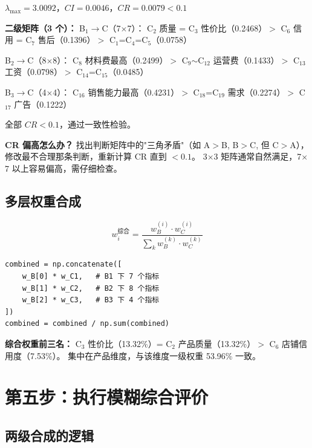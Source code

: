 \documentclass[a4paper,11pt]{ctexart}
\begin{document}
$\lambda_{\max}=3.0092$，$CI=0.0046$，$CR=0.0079 < 0.1$~\checkmark

\textbf{二级矩阵（3 个）：}
B$_1$$\to$C（7$\times$7）：
C$_2$ 质量 = C$_3$ 性价比（0.2468）$>$ C$_6$ 信用 = C$_7$ 售后（0.1396）$>$ C$_1$=C$_4$=C$_5$（0.0758）

B$_2$$\to$C（8$\times$8）：
C$_8$ 材料费最高（0.2499）$>$ C$_9$$\sim$C$_{12}$ 运营费（0.1433）$>$ C$_{13}$ 工资（0.0798）$>$ C$_{14}$=C$_{15}$（0.0485）

B$_3$$\to$C（4$\times$4）：
C$_{16}$ 销售能力最高（0.4231）$>$ C$_{18}$=C$_{19}$ 需求（0.2274）$>$ C$_{17}$ 广告（0.1222）

全部 $CR < 0.1$，通过一致性检验。

\begin{warnbox}
\textbf{CR 偏高怎么办？}
找出判断矩阵中的"三角矛盾"（如 A$>$B, B$>$C, 但 C$>$A），
修改最不合理那条判断，重新计算 CR 直到 $< 0.1$。
3$\times$3 矩阵通常自然满足，7$\times$7 以上容易偏高，需仔细检查。
\end{warnbox}

\subsection{多层权重合成}

\[
w_i^{\text{综合}} = \frac{w_B^{(i)} \cdot w_C^{(i)}}{\sum_k w_B^{(k)} \cdot w_C^{(k)}}
\]

\begin{lstlisting}
combined = np.concatenate([
    w_B[0] * w_C1,   # B1 下 7 个指标
    w_B[1] * w_C2,   # B2 下 8 个指标
    w_B[2] * w_C3,   # B3 下 4 个指标
])
combined = combined / np.sum(combined)
\end{lstlisting}

\textbf{综合权重前三名：} C$_3$ 性价比（13.32\%）= C$_2$ 产品质量（13.32\%）$>$ C$_6$ 店铺信用度（7.53\%）。
集中在产品维度，与该维度一级权重 53.96\% 一致。

\section{第五步：执行模糊综合评价}

\subsection{两级合成的逻辑}
\end{document}
